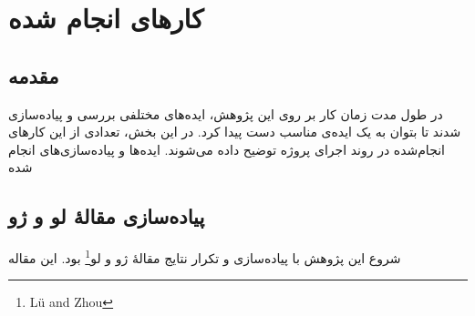 \newpage
\chapter{کارهای انجام شده}
\section{مقدمه}
در طول مدت زمان کار بر روی این پژوهش، ایده‌های مختلفی بررسی و پیاده‌سازی شدند تا بتوان به یک ایده‌ی مناسب دست پیدا کرد. در این بخش، تعدادی از این کارهای انجام‌شده در روند اجرای پروژه توضیح داده می‌شوند. ایده‌ها و پیاده‌سازی‌های انجام شده
\section{پیاده‌سازی مقالهٔ لو و ژو \cite{lu2010link}}
شروع این پژوهش با پیاده‌سازی و تکرار نتایج مقالهٔ ژو و لو\footnote{L{\"u} and Zhou} \cite{lu2010link}بود. این مقاله                                                                                                                                                                                                                                                                                                                                                                                                                                                                                                                                                                                                                                                                                                                                                                                                                                                                                                                                                                                                                                                                                                                                                                                                                                                                                                                                                                                                                                                                                                                                                                                                                                                                                                                                                                                                                                                                                                            



